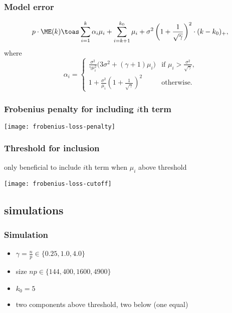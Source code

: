 \documentclass{beamer}
\begin{document}
\begin{frame}
  \frametitle{Model error}
  \begin{theorem}
\begin{equation*}
    p \cdot {\ME} (k)
        \toas
        \sum_{i=1}^{k}
            \alpha_i \mu_i
        +
        \sum_{i=k+1}^{k_0}
            \mu_i
        +
        \sigma^2
        \left(
            1 + \frac{1}{\sqrt{\gamma}}
        \right)^2
        \cdot
        (k - k_0)_+,
\end{equation*}
where
\begin{equation*}
    \alpha_i 
    =
    \begin{cases}
        \frac{\sigma^2}{\gamma \mu_i^2}
                \big(
                    3 \sigma^2 + (\gamma+1) \mu_i
                \big)
            &\text{if $\mu_i > \frac{\sigma^2}{\sqrt{\gamma}}$,} \\
        1 
        + 
        \frac{\sigma^2}{\mu_i}
        \left(
            1
            +
            \frac{1}{\sqrt{\gamma}}
        \right)^2
            &\text{otherwise.}
    \end{cases}
\end{equation*}
\end{theorem}
\end{frame}

\begin{frame}
  \frametitle{Frobenius penalty for including $i$th term}
  \begin{center}
  \texttt{[image: frobenius-loss-penalty]}
  \end{center}
\end{frame}

\begin{frame}
  \frametitle{Threshold for inclusion}
  only beneficial to include $i$th term when $\mu_i$ above threshold
  \begin{center}
  \texttt{[image: frobenius-loss-cutoff]}
  \end{center}
\end{frame}
\subsection{simulations}

\begin{frame}
  \frametitle{Simulation}
  \begin{itemize}
  \item $\gamma = \frac{n}{p} \in \{ 0.25, 1.0, 4.0 \}$
  \item size $n p \in \{ 144, 400, 1600, 4900 \}$
  \item $k_0 = 5$
  \item two components above threshold, two below (one equal)
  \end{itemize}
\end{frame}
\end{document}
